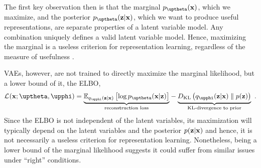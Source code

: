 The first key observation then is that the marginal $p_{\thetab}(\xb)$, which we maximize, and the posterior $p_{\thetab}(\zb|\xb)$, which we want to produce useful representations, are separate properties of a latent variable model. Any combination uniquely defines a valid latent variable model. Hence, maximizing the marginal is a useless criterion for representation learning, regardless of the measure of usefulness \parencite{huszar_is_2017, alemi_fixing_2018}. 

VAEs, however, are not trained to directly maximize the marginal likelihood, but a lower bound of it, the ELBO,
%
\begin{equation} \label{eq:variational-autoencoder-elbo-factorized (discussion copy)}
    \mathcal{L}_{}(\xb;\thetab,\phib)
    = 
    \underset{\text{reconstruction loss}}{\underbrace{
        \mathbb{E}_{q_\phib(\zb|\xb)}\left[\log p_\thetab(\xb|\zb)\right]
    }}
     - 
    \underset{\text{KL-divergence to prior}}{
        \underbrace{\vphantom{\mathbb{E}_{q_\phib(\zb|\xb)}\left[\log p_\thetab(\xb|\zb)\right]}{D_\text{KL}\left( q_\phib(\zb|\xb) \parallel p(\zb) \right)}
    }} \enspace .
\end{equation}
%
Since the ELBO is not independent of the latent variables, its maximization will typically depend on the latent variables and the posterior $p({\mathbf{z}}|{\mathbf{x}})$ and hence, it is not necessarily a useless criterion for representation learning. Nonetheless, being a lower bound of the marginal likelihood suggests it could suffer from similar issues under ``right'' conditions.


